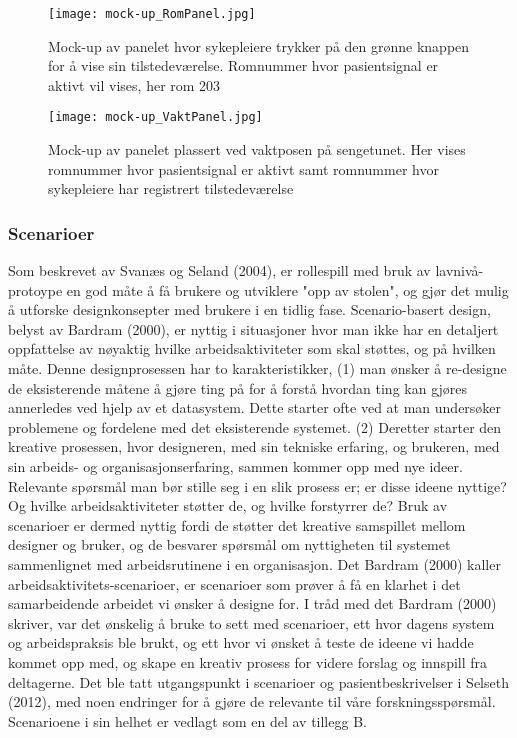 \begin{figure}[H]
\centering
\texttt{[image: mock-up\_RomPanel.jpg]}
\caption{Mock-up av panelet hvor sykepleiere trykker på den grønne knappen for å vise sin tilstedeværelse. Romnummer hvor pasientsignal er aktivt vil vises, her rom 203}
\label{mock-up_RomPanel}
\end{figure}

\begin{figure}[H]
\centering
\texttt{[image: mock-up\_VaktPanel.jpg]}
\caption{Mock-up av panelet plassert ved vaktposen på sengetunet. Her vises romnummer hvor pasientsignal er aktivt samt romnummer hvor sykepleiere har registrert tilstedeværelse}
\label{mock-up_VaktPanel}
\end{figure}

\subsubsection{Scenarioer}
Som beskrevet av Svanæs og Seland (2004), er rollespill med bruk av lavnivå-protoype en god måte å få brukere og utviklere "opp av stolen", og gjør det mulig å utforske designkonsepter med brukere i en tidlig fase. Scenario-basert design, belyst av Bardram (2000), er nyttig i situasjoner hvor man ikke har en detaljert oppfattelse av nøyaktig hvilke arbeidsaktiviteter som skal støttes, og på hvilken måte. Denne designprosessen har to karakteristikker, (1) man ønsker å re-designe de eksisterende måtene å gjøre ting på for å forstå hvordan ting kan gjøres annerledes ved hjelp av et datasystem. Dette starter ofte ved at man undersøker problemene og fordelene med det eksisterende systemet. (2) Deretter starter den kreative prosessen, hvor designeren, med sin tekniske erfaring, og brukeren, med sin arbeids- og organisasjonserfaring, sammen kommer opp med nye ideer. Relevante spørsmål man bør stille seg i en slik prosess er; er disse ideene nyttige? Og hvilke arbeidsaktiviteter støtter de, og hvilke forstyrrer de? Bruk av scenarioer er dermed nyttig fordi de støtter det kreative samspillet mellom designer og bruker, og de besvarer spørsmål om nyttigheten til systemet sammenlignet med arbeidsrutinene i en organisasjon. Det Bardram (2000)\nocite{Bardram00} kaller arbeidsaktivitets-scenarioer, er scenarioer som prøver å få en klarhet i det samarbeidende arbeidet vi ønsker å designe for. 
I tråd med det Bardram (2000) skriver, var det ønskelig å bruke to sett med scenarioer, ett hvor dagens system og arbeidspraksis ble brukt, og ett hvor vi ønsket å teste de ideene vi hadde kommet opp med, og skape en kreativ prosess for videre forslag og innspill fra deltagerne. Det ble tatt utgangspunkt i scenarioer og pasientbeskrivelser i Selseth (2012), med noen endringer for å gjøre de relevante til våre forskningsspørsmål. Scenarioene i sin helhet er vedlagt som en del av tillegg B.

